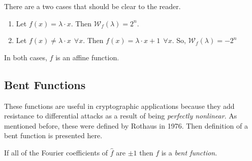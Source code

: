 \begin{example}
  There are a two cases that should be clear to the reader.
  \begin{enumerate}[1.]
    \item Let $f(x)=\lambda\cdot x$. Then $\mathcal{W}_f(\lambda)=2^n$.
    \item Let $f(x)\not=\lambda\cdot x \ \ \forall x$. Then $f(x)=
      \lambda\cdot x+1 \ \ \forall x$. So, $\mathcal{W}_f(\lambda)=-2^n$
  \end{enumerate}
  In both cases, $f$ is an affine function.
\end{example}

\subsection{Bent Functions}
\par These functions are useful in cryptographic applications because they
add resistance to differential attacks as a result of being \textit{perfectly
nonlinear}. As mentioned before, these were defined by Rothaus in 1976. Then
definition of a bent function is presented here.

\begin{definition}\label{def:bent-function}
  If all of the Fourier coefficients of $\hat{f}$ are $\pm1$ then
  $f$ is a \textit{bent function}.
\end{definition}

